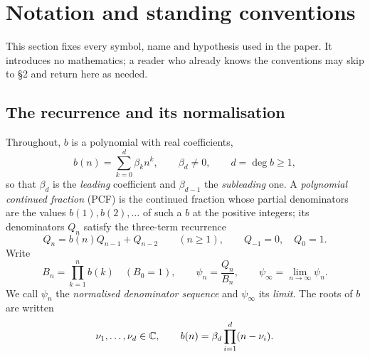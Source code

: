 %

\section{Notation and standing conventions}\label{sec:notation}

This section fixes every symbol, name and hypothesis used in the paper. It
introduces no mathematics; a reader who already knows the conventions may skip
to \S2 and return here as needed.

\subsection{The recurrence and its normalisation}\label{ssec:recurrence}

Throughout, $b$ is a polynomial with real coefficients,
\[
  b(n)=\sum_{k=0}^{d}\beta_k n^k ,\qquad \beta_d\neq0,\qquad d=\deg b\ge1 ,
\]
so that $\beta_d$ is the \emph{leading} coefficient and $\beta_{d-1}$ the
\emph{subleading} one. A \emph{polynomial continued fraction} (PCF) is the
continued fraction whose partial denominators are the values $b(1),b(2),\dots$
of such a $b$ at the positive integers; its denominators $Q_n$ satisfy the
three-term recurrence
\begin{equation}\label{eq:n-rec}
  Q_n=b(n)Q_{n-1}+Q_{n-2}\qquad(n\ge1),\qquad Q_{-1}=0,\quad Q_0=1 .
\end{equation}
Write
\begin{equation}\label{eq:n-norm}
  B_n=\prod_{k=1}^{n}b(k)\quad(B_0=1),\qquad
  \psi_n=\frac{Q_n}{B_n},\qquad
  \psi_\infty=\lim_{n\to\infty}\psi_n .
\end{equation}
We call $\psi_n$ the \emph{normalised denominator sequence} and $\psi_\infty$ its
\emph{limit}. The roots of $b$ are written
\begin{equation}\label{eq:n-roots}
  \nu_1,\dots,\nu_d\in\mathbb{C},\qquad b(n)=\beta_d\prod_{i=1}^{d}(n-\nu_i).
\end{equation}

